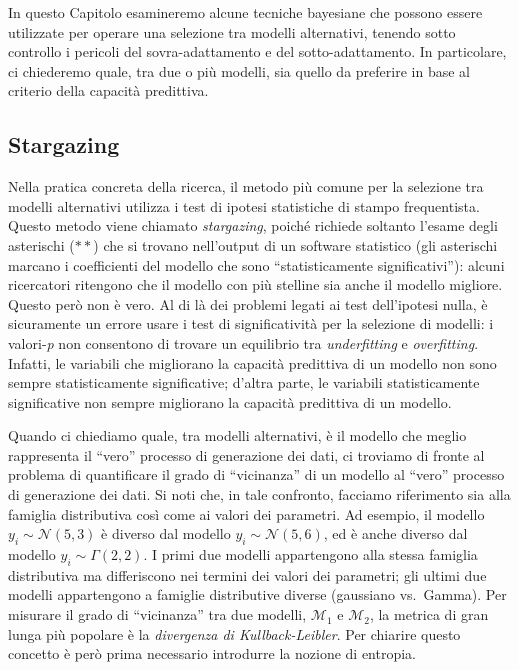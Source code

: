 \documentclass[
  11pt,
]{krantz}
\theoremstyle{definition}
\theoremstyle{definition}
\theoremstyle{definition}
\theoremstyle{definition}
\theoremstyle{remark}
\begin{document}
In questo Capitolo esamineremo alcune tecniche bayesiane che possono essere utilizzate per operare una selezione tra modelli alternativi, tenendo sotto controllo i pericoli del sovra-adattamento e del sotto-adattamento. In particolare, ci chiederemo quale, tra due o più modelli, sia quello da preferire in base al criterio della capacità predittiva.

\hypertarget{stargazing}{%
\subsection{Stargazing}\label{stargazing}}

Nella pratica concreta della ricerca, il metodo più comune per la selezione tra modelli alternativi utilizza i test di ipotesi statistiche di stampo frequentista. Questo metodo viene chiamato \emph{stargazing}, poiché richiede soltanto l'esame degli asterischi (\(**\)) che si trovano nell'output di un software statistico (gli asterischi marcano i coefficienti del modello che sono ``statisticamente significativi''): alcuni ricercatori ritengono che il modello con più stelline sia anche il modello migliore. Questo però non è vero. Al di là dei problemi legati ai test dell'ipotesi nulla, è sicuramente un errore usare i test di significatività per la selezione di modelli: i valori-\emph{p} non consentono di trovare un equilibrio tra \emph{underfitting} e \emph{overfitting}. Infatti, le variabili che migliorano la capacità predittiva di un modello non sono sempre statisticamente significative; d'altra parte, le variabili statisticamente significative non sempre migliorano la capacità predittiva di un modello.

Quando ci chiediamo quale, tra modelli alternativi, è il modello che meglio rappresenta il ``vero'' processo di generazione dei dati, ci troviamo di fronte al problema di quantificare il grado di ``vicinanza'' di un modello al ``vero'' processo di generazione dei dati. Si noti che, in tale confronto, facciamo riferimento sia alla famiglia distributiva così come ai valori dei parametri. Ad esempio, il modello \(y_i \sim \mathcal{N}(5, 3)\) è diverso dal modello \(y_i \sim \mathcal{N}(5, 6)\), ed è anche diverso dal modello \(y_i \sim \Gamma(2, 2)\). I primi due modelli appartengono alla stessa famiglia distributiva ma differiscono nei termini dei valori dei parametri; gli ultimi due modelli appartengono a famiglie distributive diverse (gaussiano vs.~Gamma). Per misurare il grado di ``vicinanza'' tra due modelli, \(\mathcal{M}_1\) e \(\mathcal{M}_2\), la metrica di gran lunga più popolare è la \emph{divergenza di Kullback-Leibler}. Per chiarire questo concetto è però prima necessario introdurre la nozione di entropia.
\end{document}
